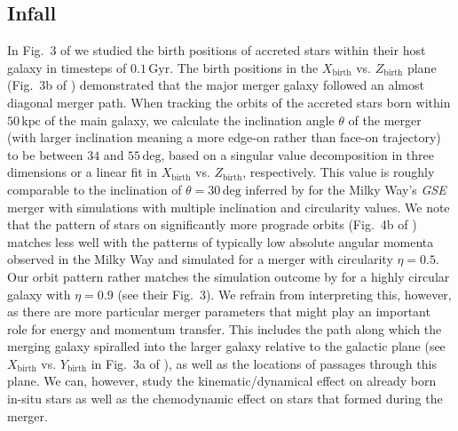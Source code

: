 \documentclass[fleqn,usenatbib]{mnras}
\begin{document}
\subsection{Infall}

In Fig.~3 of  we studied the birth positions of accreted stars within their host galaxy in timesteps of $0.1\,\mathrm{Gyr}$. The birth positions in the $X_\mathrm{birth}$ vs. $Z_\mathrm{birth}$ plane (Fig.~3b of ) demonstrated that the major merger galaxy followed an almost diagonal merger path. When tracking the orbits of the accreted stars born within $50\,\mathrm{kpc}$ of the main galaxy, we calculate the inclination angle $\theta$ of the merger (with larger inclination meaning a more edge-on rather than face-on trajectory) to be between $34$ and $55\,\mathrm{deg}$, based on a singular value decomposition in three dimensions or a linear fit in $X_\mathrm{birth}$ vs. $Z_\mathrm{birth}$, respectively. This value is roughly comparable to the inclination of $\theta = 30\,\mathrm{deg}$ inferred by \citet{Naidu2021} for the Milky Way's \textit{GSE} merger with simulations with multiple inclination and circularity values. We note that the pattern of stars on significantly more prograde orbits (Fig.~4b of ) matches less well with the patterns of typically low absolute angular momenta observed in the Milky Way and simulated for a merger with circularity $\eta = 0.5$. Our orbit pattern rather matches the simulation outcome by \citet{Naidu2021} for a highly circular galaxy with $\eta = 0.9$ (see their Fig.~3). We refrain from interpreting this, however, as there are more particular merger parameters that might play an important role for energy and momentum transfer. This includes the path along which the merging galaxy spiralled into the larger galaxy relative to the galactic plane (see $X_\mathrm{birth}$ vs. $Y_\mathrm{birth}$ in Fig.~3a of ), as well as the locations of passages through this plane.
We can, however, study the kinematic/dynamical effect on already born in-situ stars as well as the chemodynamic effect on stars that formed during the merger.
\end{document}
